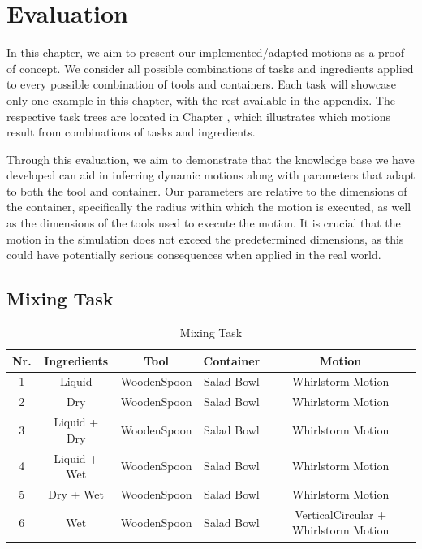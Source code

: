 \chapter{Evaluation}

In this chapter, we aim to present our implemented/adapted motions as a proof of concept. We consider all possible combinations of tasks and ingredients applied to every possible combination of tools and containers. Each task will showcase only one example in this chapter, with the rest available in the appendix. The respective task trees are located in Chapter , which illustrates which motions result from combinations of tasks and ingredients.

Through this evaluation, we aim to demonstrate that the knowledge base we have developed can aid in inferring dynamic motions along with parameters that adapt to both the tool and container. Our parameters are relative to the dimensions of the container, specifically the radius within which the motion is executed, as well as the dimensions of the tools used to execute the motion. It is crucial that the motion in the simulation does not exceed the predetermined dimensions, as this could have potentially serious consequences when applied in the real world.
\section{Mixing Task}

\begin{table}[H]
    \centering
    \begin{tabular}{|c|c|c|c|c|}
      \hline
      \textbf{Nr.} & \textbf{Ingredients} & \textbf{Tool} & \textbf{Container} & \textbf{Motion}  \\
      \hline
      1 & Liquid & WoodenSpoon & Salad Bowl & Whirlstorm Motion \\
      \hline
      2 & Dry & WoodenSpoon & Salad Bowl & Whirlstorm Motion \\
      \hline
      3 & Liquid + Dry & WoodenSpoon & Salad Bowl & Whirlstorm Motion \\
      \hline
      4 & Liquid + Wet & WoodenSpoon & Salad Bowl & Whirlstorm Motion \\
      \hline
      5 & Dry + Wet & WoodenSpoon & Salad Bowl & Whirlstorm Motion \\
      \hline
      6 & Wet & WoodenSpoon & Salad Bowl & VerticalCircular + Whirlstorm Motion \\
      \hline
    \end{tabular}
    \caption{Mixing Task}
    \label{tab:mixingtask}
  \end{table}

